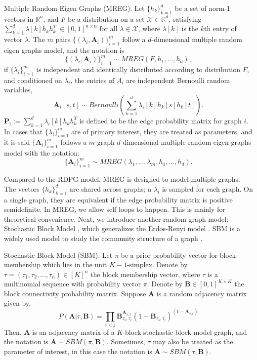 \documentclass[10pt,journal,compsoc]{IEEEtran}
\newenvironment{definition}[1][Definition]{\begin{trivlist}
		\item[\hskip \labelsep {\bfseries #1}]}{\end{trivlist}}
\newcommand{\bA}{\mathbf{A}}
\newcommand{\bP}{\mathbf{P}}
\newcommand{\bB}{\mathbf{B}}
\begin{document}
\begin{definition} Multiple Random Eigen Graphs (MREG). Let $\{h_k\}_{k=1}^{d}$ be a set of norm-1 vectors in $\mathbb{R}^{n}$, and  $F$ be a distribution on a set $\mathcal{X} \in \mathbb{R}^d$,  satisfying $\sum\limits_{k=1}^{d} \lambda [k] h_k  h_k^T \  \in [0, 1]^{n \times n} $ for all $\lambda \in \mathcal{X}$, where $\lambda[k]$ is the $k$th entry of vector $\lambda$. The $m$ pairs $\{(\lambda_i, \bA_i)\}_{i=1}^m$ follow a $d$-dimensional multiple random eigen graphs model, and the notation is
	\[\{(\lambda_i,\bA_i)\}_{i=1}^m \sim MREG(F,h_1,...,h_d),\]
	if $\{\lambda_i\}_{i=1}^m$ is independent and identically distributed according to distribution $F$, and conditioned on $\lambda_i$, the entries of $A_i$ are independent Bernoulli random variables,
	\[ \bA_{i}[s,t] \sim Bernoulli( \sum_{k=1}^{d} \lambda_{i}[k] h_{k} [s] h_{k} [t] ). \]
	$\bP_i:=\sum_{k=1}^{d} \lambda_i [k] h_k  h_k^T$ is defined to be the edge probability matrix for graph $i$. In cases that $\{\lambda_i\}_{i=1}^m$ are of primary interest, they are treated as parameters, and it is said $\{\bA_i\}_{i=1}^{m}$ follows a $m$-graph $d$-dimensional multiple random eigen graphs model with the notation:
	\[\{\bA_i\}_{i=1}^{m} \sim MREG(\lambda_1,...,\lambda_m,h_1,...,h_d).\] 
\end{definition}
Compared to the RDPG model, MREG is designed to model multiple graphs. The vectors $\{h_k\}_{k=1}^{d}$ are shared across graphs; a  $\lambda_i$ is sampled for each graph. On a single graph, they are equivalent if the edge probability matrix is positive semidefinite. In MREG, we allow self loops to happen. This is mainly for theoretical convenience. Next, we introduce another random graph model: Stochastic Block Model \cite{holland1983stochastic}, which generalizes the Erdos-Renyi model \cite{erdds1959random}. SBM is a widely used model to study the community structure of a  graph \cite{karrer2011stochastic, lyzinski2015community}.\\

\begin{definition} Stochastic Block Model (SBM). Let $\pi$ be a prior probability vector for block membership which lies in the unit $K-1$-simplex. Denote by $\tau=(\tau_1,\tau_2,...,\tau_n) \in [K]^n$ the block membership vector, where $\tau$ is a multinomial sequence with probability vector $\pi$.
Denote by $\bB \in [0,1]^{K \times K}$ the block connectivity probability matrix. Suppose $\bA$ is a random adjacency matrix given by,
\[ P(\bA|\tau,\bB)= \prod_{i<j} \bB_{\tau_s,\tau_t}^{\bA_{s,t}} (1-\bB_{\tau_s,\tau_t})^{(1-\bA_{s,t})}\] 
Then, $\bA$ is an adjacency matrix of a $K$-block stochastic block model graph, and the notation is $\bA \sim SBM(\pi,\bB)$. Sometimes, $\tau$ may also be treated as the parameter of interest, in this case the notation is $\bA \sim SBM(\tau,\bB)$.
\end{definition}
\end{document}
